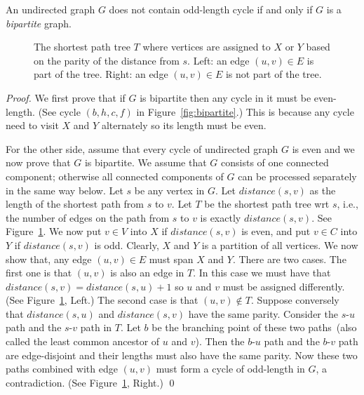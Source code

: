 \begin{fact}
An undirected graph $G$ does not contain odd-length cycle if and only if $G$ is a \emph{bipartite} graph.
\end{fact}

\begin{figure}[!b]
\centering{}
\caption{The shortest path tree $T$ where vertices are assigned to $X$ or $Y$
based on the parity of the distance from $s$. Left: an edge $(u,v)\in E$ is part of the tree.
Right: an edge $(u,v)\in E$ is not part of the tree.}
\label{fig:spt}
\end{figure}



\emph{Proof.} We first prove that if $G$ is bipartite then
any cycle in it must be even-length. (See cycle $(b,h,c,f)$ in Figure~\ref{fig:bipartite}.)
This is because any cycle need to visit $X$ and $Y$ alternately so its length must be even.

For the other side, assume that every cycle of undirected graph $G$ is even
and we now prove that $G$ is bipartite. 
We assume that $G$ consists of one connected component; otherwise all connected components of $G$
can be processed separately in the same way below.
Let $s$ be any vertex in $G$.  Let $distance(s,v)$ as
the length of the shortest path from $s$ to $v$. 
Let $T$ be the shortest path tree wrt $s$, i.e.,
the number of edges on the path from $s$ to $v$ is exactly $distance(s,v)$.
See Figure~\ref{fig:spt}.
We now put $v\in V$ into $X$ if $distance(s,v)$ is even, 
and put $v\in C$ into $Y$ if $distance(s,v)$ is odd. 
Clearly, $X$ and $Y$ is a partition of all vertices.
We now show that, any edge $(u,v)\in E$ must span $X$ and $Y$.
There are two cases. The first one is that $(u,v)$ is also an edge in $T$.
In this case we must have that $distance(s,v) = distance(s,u) + 1$ so $u$ and $v$ must be assigned differently.
(See Figure~\ref{fig:spt}, Left.)
The second case is that $(u,v)\not\in T$.
Suppose conversely that $distance(s,u)$ and $distance(s,v)$ have the same parity. 
Consider the $s$-$u$ path and the $s$-$v$ path in $T$.
Let $b$ be the branching point of these two paths~(also called the least common ancestor of $u$ and $v$).
Then the $b$-$u$ path and the $b$-$v$ path are edge-disjoint and their lengths must also have the same parity.
Now these two paths combined with edge $(u,v)$ must form a cycle of odd-length in $G$, a contradiction. 
(See Figure~\ref{fig:spt}, Right.) \qed



